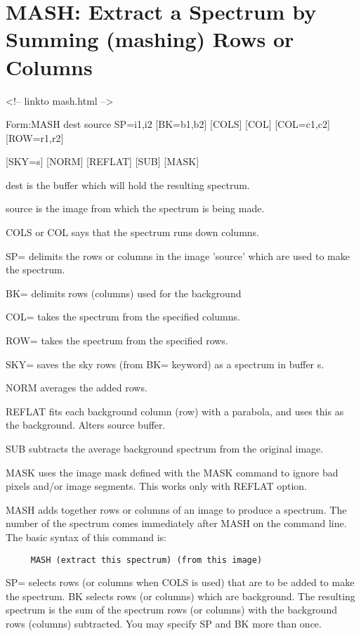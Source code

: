 \section{MASH: Extract a Spectrum by Summing (mashing) Rows or Columns}
\begin{rawhtml}
<!-- linkto mash.html -->
\end{rawhtml}
\begin{command}
  \item[Form:MASH dest source SP=i1,i2 {[BK=b1,b2]} {[COLS]} {[COL]} 
       {[COL=c1,c2]} {[ROW=r1,r2]}\hfill]{}
  \item{{[SKY=s]} {[NORM]} {[REFLAT]} {[SUB]} {[MASK]}}
  \item[dest\hfill]{is the buffer which will hold the resulting spectrum.}
  \item[source\hfill]{is the image from which the spectrum is being made.}
  \item[COLS or COL\hfill]{says that the spectrum runs down columns.}
  \item[SP=\hfill]{delimits the rows or columns in the image 
        'source' which are used to make the spectrum.}
  \item[BK=\hfill]{delimits rows (columns) used for the background}
  \item[COL=\hfill]{takes the spectrum from the specified columns.}
  \item[ROW=\hfill]{takes the spectrum from the specified rows.}
  \item[SKY=\hfill]{saves the sky rows (from BK= keyword) as a
        spectrum in buffer s.}
  \item[NORM\hfill]{averages the added rows.}
  \item[REFLAT\hfill]{fits each background column (row) with a parabola, 
        and uses this as the background.  Alters source buffer.}
  \item[SUB\hfill]{subtracts the average background spectrum from
        the original image.}
  \item[MASK\hfill]{uses the image mask defined with the MASK
       command to ignore bad pixels and/or image}
       segments.  This works only with REFLAT option.
\end{command}

MASH adds together rows or columns of an image to produce a spectrum. The
number of the spectrum comes immediately after MASH on the command
line. The basic syntax of this command is:
\begin{verbatim}
     MASH (extract this spectrum) (from this image)
\end{verbatim}
SP= selects rows (or columns when COLS is used) that are to be added to
make the spectrum.  BK selects rows (or columns) which are background.  The
resulting spectrum is the sum of the spectrum rows (or columns) with the
background rows (columns) subtracted. You may specify SP and BK more than
once.

